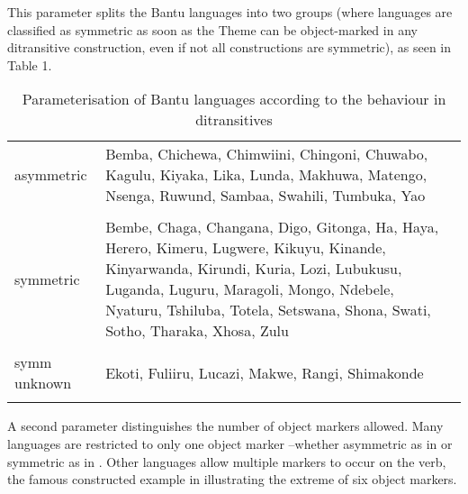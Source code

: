 \documentclass[output=paper
,modfonts
,nonflat]{langsci/langscibook}
\begin{document}
This parameter splits the Bantu languages into two groups (where languages are classified as symmetric as soon as the Theme can be object-marked in any ditransitive construction, even if not all constructions are symmetric), as seen in Table 1.
\begin{table}
\caption{Parameterisation of Bantu languages according to the behaviour in ditransitives}
\label{Table 1}	
	\begin{tabularx}{\textwidth}{lX}
	\lsptoprule
	asymmetric & Bemba, Chichewa, Chimwiini, Chingoni, Chuwabo, Kagulu, Kiyaka,
	Lika, Lunda, Makhuwa, Matengo, Nsenga, Ruwund, Sambaa, Swahili, Tumbuka, Yao\\ \\
	\midrule
	symmetric & Bembe, Chaga, Changana, Digo, Gitonga, Ha, Haya, Herero, Kimeru, Lugwere, Kikuyu, Kinande, Kinyarwanda, Kirundi, Kuria, Lozi, Lubukusu, Luganda, Luguru, Maragoli, Mongo, Ndebele, Nyaturu, Tshiluba, Totela, Setswana, Shona, Swati, Sotho, Tharaka, Xhosa, Zulu\\ \\
	\midrule
	symm unknown & Ekoti, Fuliiru, Lucazi, Makwe, Rangi, Shimakonde\\
	\lspbottomrule
	\end{tabularx}
\end{table} 
A second parameter distinguishes the number of object markers allowed. Many languages are restricted to only one object marker –whether asymmetric as in  or symmetric as in . Other languages allow multiple markers to occur on the verb, the famous constructed example in  illustrating the extreme of six object markers.
\end{document}
